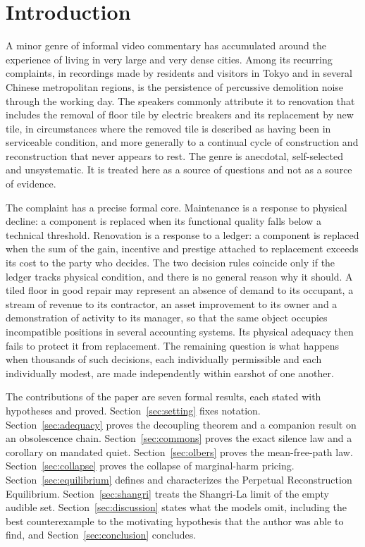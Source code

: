 \documentclass[11pt]{article}
\theoremstyle{definition}
\theoremstyle{remark}
\begin{document}
\section{Introduction}

A minor genre of informal video commentary has accumulated around the experience of living in very large and very dense cities. Among its recurring complaints, in recordings made by residents and visitors in Tokyo and in several Chinese metropolitan regions, is the persistence of percussive demolition noise through the working day. The speakers commonly attribute it to renovation that includes the removal of floor tile by electric breakers and its replacement by new tile, in circumstances where the removed tile is described as having been in serviceable condition, and more generally to a continual cycle of construction and reconstruction that never appears to rest. The genre is anecdotal, self-selected and unsystematic. It is treated here as a source of questions and not as a source of evidence.

The complaint has a precise formal core. Maintenance is a response to physical decline: a component is replaced when its functional quality falls below a technical threshold. Renovation is a response to a ledger: a component is replaced when the sum of the gain, incentive and prestige attached to replacement exceeds its cost to the party who decides. The two decision rules coincide only if the ledger tracks physical condition, and there is no general reason why it should. A tiled floor in good repair may represent an absence of demand to its occupant, a stream of revenue to its contractor, an asset improvement to its owner and a demonstration of activity to its manager, so that the same object occupies incompatible positions in several accounting systems. Its physical adequacy then fails to protect it from replacement. The remaining question is what happens when thousands of such decisions, each individually permissible and each individually modest, are made independently within earshot of one another.

The contributions of the paper are seven formal results, each stated with hypotheses and proved. Section~\ref{sec:setting} fixes notation. Section~\ref{sec:adequacy} proves the decoupling theorem and a companion result on an obsolescence chain. Section~\ref{sec:commons} proves the exact silence law and a corollary on mandated quiet. Section~\ref{sec:olbers} proves the mean-free-path law. Section~\ref{sec:collapse} proves the collapse of marginal-harm pricing. Section~\ref{sec:equilibrium} defines and characterizes the Perpetual Reconstruction Equilibrium. Section~\ref{sec:shangri} treats the Shangri-La limit of the empty audible set. Section~\ref{sec:discussion} states what the models omit, including the best counterexample to the motivating hypothesis that the author was able to find, and Section~\ref{sec:conclusion} concludes.
\end{document}
